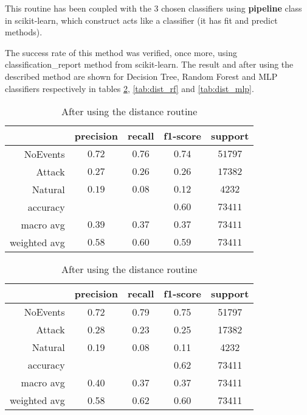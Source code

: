 This routine has been coupled with the 3 chosen classifiers using \textbf{pipeline} class in scikit-learn, which construct acts like a classifier (it has fit and predict methods). 

The success rate of this method was verified, once more, using classification\_report method from scikit-learn. The result and after using the described method are shown for Decision Tree, Random Forest and MLP classifiers respectively in tables \ref{tab:dist_dt}, \ref{tab:dist_rf} and \ref{tab:dist_mlp}.

\begin{table}[H]
    \centering \footnotesize
    \caption{Distance routine results for Decision Tree classifier}  \label{tab:dist_dt}
    \begin{subtable}[t]{.5\linewidth}
        \centering
        \caption{Before using the distance routine} 
        \begin{tabular}{rcccc}\toprule
            & precision    &recall & f1-score  & support \\\midrule
                NoEvents  &   $  0.72 $  &  $ 0.76 $  &  $ 0.74 $  & $ 51797 $\\
                  Attack   &  $  0.27 $   & $ 0.26 $  &  $ 0.26 $  & $ 17382 $\\
                 Natural   &  $  0.19 $   & $ 0.08 $  &  $ 0.12 $  & $  4232 $\\
                accuracy   &            &          &  $0.60$  &   $73411$ \\
               macro avg   &  $  0.39 $   & $ 0.37 $  &  $ 0.37 $  & $ 73411 $\\
            weighted avg   &  $  0.58 $  &  $ 0.60 $  &  $ 0.59 $ &  $ 73411 $\\\bottomrule
        \end{tabular}
    \end{subtable}%
    \begin{subtable}[t]{.5\linewidth}
        \centering
        \caption{After using the distance routine} 
        \begin{tabular}{rcccc}\toprule
         &   precision    &recall & f1-score &  support  \\\midrule
    
            NoEvents    &   0.72   &   0.79   &   0.75  &   51797 \\
              Attack    &   0.28   &   0.23   &   0.25  &   17382 \\
             Natural   &    0.19   &   0.08   &   0.11  &    4232 \\
        
            accuracy    &           &         &   0.62   &  73411 \\
           macro avg    &   0.40    &  0.37   &   0.37  &   73411 \\
        weighted avg   &   0.58   &   0.62   &   0.60   &  73411   \\  \bottomrule
        \end{tabular}
    \end{subtable}
\end{table}

